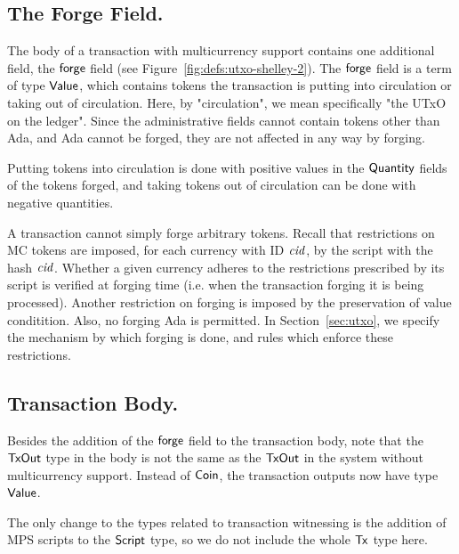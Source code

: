\subsection*{The Forge Field.}

The body of a transaction with multicurrency support contains one additional
field, the $\mathsf{forge}$ field (see Figure~\ref{fig:defs:utxo-shelley-2}).
The $\mathsf{forge}$ field is a term of type $\mathsf{Value}$, which contains
tokens the transaction is putting into circulation or taking out of
circulation. Here, by "circulation", we mean specifically "the UTxO on the
ledger". Since the administrative fields cannot contain tokens other than Ada,
and Ada cannot be forged, they are not affected in any way by forging.

Putting tokens into circulation is done with positive values in the $\mathsf{Quantity}$
fields of the tokens forged, and taking tokens out of circulation can be done
with negative quantities.

A transaction cannot simply forge arbitrary tokens. Recall that restrictions on
MC tokens are imposed, for each currency with ID $\mathit{cid}$, by the script
with the hash $\mathit{cid}$. Whether a given currency adheres to the restrictions
prescribed by its script is verified at forging time (i.e. when the transaction
forging it is being processed). Another restriction on forging is imposed by
the preservation of value conditition. Also, no forging Ada
is permitted. In Section~\ref{sec:utxo}, we specify the mechanism by which
forging is done, and rules which enforce these restrictions.

\subsection*{Transaction Body.}

Besides the addition of the $\mathsf{forge}$ field to the transaction body,
note that the $\mathsf{TxOut}$ type in the body is not the same as
the $\mathsf{TxOut}$ in the system without multicurrency support. Instead of
$\mathsf{Coin}$, the transaction outputs now have type $\mathsf{Value}$.

The only change to the types related to transaction witnessing is the addition
of MPS scripts to the $\mathsf{Script}$ type, so we do not include the whole $\mathsf{Tx}$ type here.

